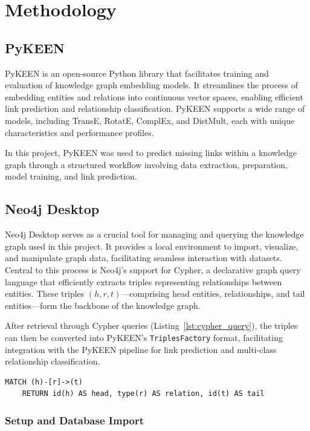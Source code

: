\section*{Methodology}

\subsection*{PyKEEN}

PyKEEN \cite{pykeen} is an open-source Python library that facilitates training and evaluation of knowledge graph embedding models.
It streamlines the process of embedding entities and relations into continuous vector spaces, enabling efficient link prediction and relationship classification.
PyKEEN supports a wide range of models, including TransE, RotatE, ComplEx, and DistMult, each with unique characteristics and performance profiles.

In this project, PyKEEN was used to predict missing links within a knowledge graph through a structured workflow involving data extraction, preparation, model training, and link prediction.

\subsection*{Neo4j Desktop}

Neo4j Desktop \cite{neo4j} serves as a crucial tool for managing and querying the knowledge graph used in this project.
It provides a local environment to import, visualize, and manipulate graph data, facilitating seamless interaction with datasets.
Central to this process is Neo4j's support for Cypher, a declarative graph query language that efficiently extracts triples representing relationships between entities.
These triples $(h, r, t)$---comprising head entities, relationships, and tail entities---form the backbone of the knowledge graph.

After retrieval through Cypher queries (Listing~\ref{lst:cypher_query}), the triples can then be converted into PyKEEN's \texttt{TriplesFactory} format, facilitating integration with the PyKEEN pipeline for link prediction and multi-class relationship classification.

\begin{lstlisting}[caption=Cypher query to retrieve triples., label=lst:cypher_query]
    MATCH (h)-[r]->(t)
    RETURN id(h) AS head, type(r) AS relation, id(t) AS tail
\end{lstlisting}

\subsubsection*{Setup and Database Import}

